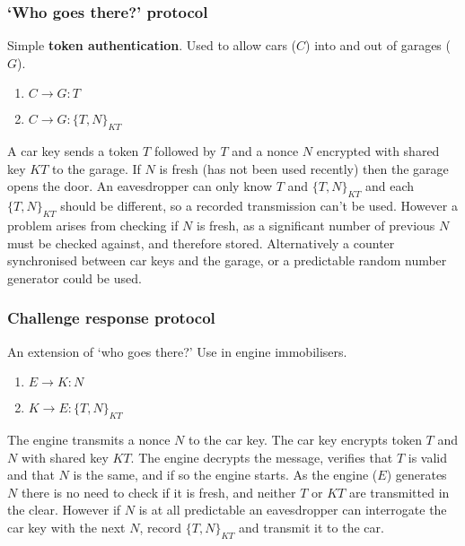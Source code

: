 \documentclass[final]{article}
\begin{document}
\subsubsection{`Who goes there?' protocol}
Simple \textbf{token authentication}. Used to allow cars ($ C $) into and out of garages ($ G $).
\begin{enumerate}
	\item $ C \rightarrow G : T $
	\item $ C \rightarrow G : \{ T, N \}_{KT} $
\end{enumerate}
A car key sends a token $ T $ followed by $ T $ and a nonce $ N $ encrypted with shared key $ KT $ to the garage. If $ N $ is fresh (has not been used recently) then the garage opens the door. An eavesdropper can only know $ T $ and $ \{ T, N \}_{KT} $ and each $ \{ T, N \}_{KT} $ should be different, so a recorded transmission can't be used. However a problem arises from checking if $ N $ is fresh, as a significant number of previous $ N $ must be checked against, and therefore stored. Alternatively a counter synchronised between car keys and the garage, or a predictable random number generator could be used.

\subsubsection{Challenge response protocol}
An extension of `who goes there?' Use in engine immobilisers.
\begin{enumerate}
	\item $ E \rightarrow K : N $
	\item $ K \rightarrow E : \{ T, N \}_{KT} $
\end{enumerate}
The engine transmits a nonce $ N $ to the car key. The car key encrypts token $ T $ and $ N $ with shared key $ KT $. The engine decrypts the message, verifies that $ T $ is valid and that $ N $ is the same, and if so the engine starts. As the engine ($ E $) generates $ N $ there is no need to check if it is fresh, and neither $ T $ or $ KT $ are transmitted in the clear. However if $ N $ is at all predictable an eavesdropper can interrogate the car key with the next $ N $, record $ \{ T, N \}_{KT} $ and transmit it to the car.
\end{document}
